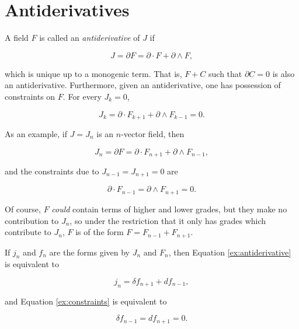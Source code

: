 \documentclass{article}
\begin{document}
\section{Antiderivatives}

A field $F$ is called an \emph{antiderivative} of $J$ if

\begin{equation}
  J = \partial F = \partial \cdot F + \partial \wedge F,\label{eq:antiderivative}
\end{equation}

which is unique up to a monogenic term. That is, $F + C$ such that $\partial C = 0$ is also an antiderivative. Furthermore, given an antiderivative, one has possession of constraints on $F$. For every $J_k = 0$,

\begin{equation}
  J_k = \partial \cdot F_{k+1} + \partial \wedge F_{k-1} = 0.\label{eq:constraints}
\end{equation}

As an example, if $J = J_n$ is an $n$-vector field, then 

\begin{equation}
  J_n = \partial F = \partial \cdot F_{n+1} + \partial \wedge F_{n-1},\label{ex:antiderivative}
\end{equation}

and the constraints due to $J_{n-1} = J_{n+1} = 0$ are

\begin{equation}
  \partial \cdot F_{n-1} = \partial \wedge F_{n+1} = 0.\label{ex:constraints}
\end{equation}

Of course, $F$ \emph{could} contain terms of higher and lower grades, but they make no contribution to $J_n$, so under the restriction that it only has grades which contribute to $J_n$, $F$ is of the form $F = F_{n-1} + F_{n+1}$.

If $j_n$ and $f_n$ are the forms given by $J_n$ and $F_n$, then Equation \ref{ex:antiderivative} is equivalent to

\begin{equation}
  j_n = \delta f_{n+1} + d f_{n-1},
\end{equation}

and Equation \ref{ex:constraints} is equivalent to

\begin{equation}
  \delta f_{n-1} = d f_{n+1} = 0.
\end{equation}
\end{document}
